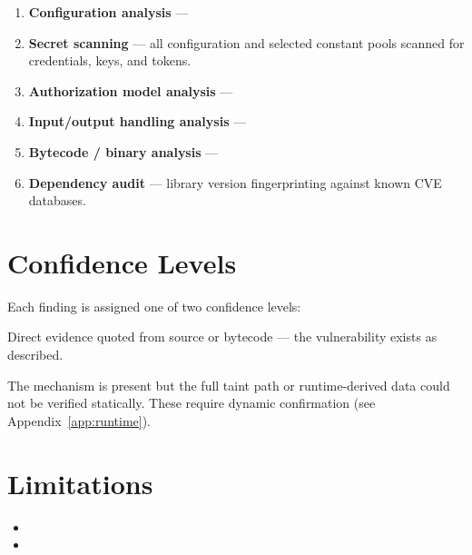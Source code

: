 \begin{enumerate}
  \item \textbf{Configuration analysis} --- 
  \item \textbf{Secret scanning} --- all configuration and selected constant pools scanned for
    credentials, keys, and tokens.
  \item \textbf{Authorization model analysis} --- 
  \item \textbf{Input/output handling analysis} --- 
  \item \textbf{Bytecode / binary analysis} --- 
  \item \textbf{Dependency audit} --- library version fingerprinting against known CVE databases.
\end{enumerate}

\section{Confidence Levels}

Each finding is assigned one of two confidence levels:

\begin{description}[leftmargin=3cm]
  \item[\Confirmed] Direct evidence quoted from source or bytecode --- the vulnerability exists
    as described.
  \item[\Suspected] The mechanism is present but the full taint path or runtime-derived data
    could not be verified statically. These require dynamic confirmation (see
    Appendix~\ref{app:runtime}).
\end{description}

\section{Limitations}

\begin{itemize}
  \item {}
  \item {}
\end{itemize}
